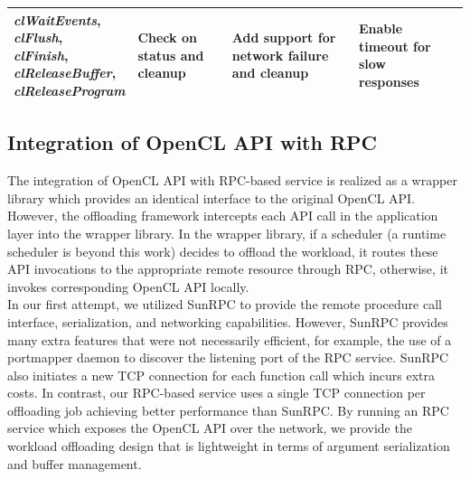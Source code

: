 \documentclass[conference]{IEEEtran}
\begin{document}
\begin{table}[!t]
\begin{tabular}{p{2.5cm}|p{3cm}|p{3cm}|p{3cm}|p{2.5cm}}
\parbox{3cm}{\centering
\textit{clWaitEvents},\\\textit{clFlush},\\\textit{clFinish},\\\textit{clReleaseBuffer},\\\textit{clReleaseProgram}}
& \parbox{3cm}{\centering Check on status and\\ cleanup} &
\parbox{3cm}{\centering Add support for network failure\\ and cleanup} &
\parbox{2.5cm}{\centering Enable timeout for\\ slow responses} \\ \hline
    \end{tabular}
\end{table}
\subsection{Integration of OpenCL API with RPC}
The integration of OpenCL API with RPC-based service is realized as a
wrapper library which provides an identical interface to the original
OpenCL API.
%
However, the offloading framework intercepts each API call in the
application layer into the wrapper library.
%
In the wrapper library, if a scheduler (a runtime scheduler is beyond
this work) decides to offload the workload, it routes these API
invocations to the appropriate remote resource through RPC, otherwise,
it invokes corresponding OpenCL API locally.\\
%
\indent In our first attempt, we utilized SunRPC to provide
the remote procedure call interface, serialization, and networking
capabilities.
%
However, SunRPC provides many extra features that were not necessarily
efficient, for example, the use of a portmapper daemon to discover the
listening port of the RPC service.
%
SunRPC also initiates a new TCP connection for each function call which
incurs extra costs.
%
In contrast, our RPC-based service uses a single TCP connection per
offloading job achieving better performance than SunRPC.
%
By running an RPC service which exposes the OpenCL API over the network,
we provide the workload offloading design that is lightweight in terms
of argument serialization and buffer management.
%
\end{document}
